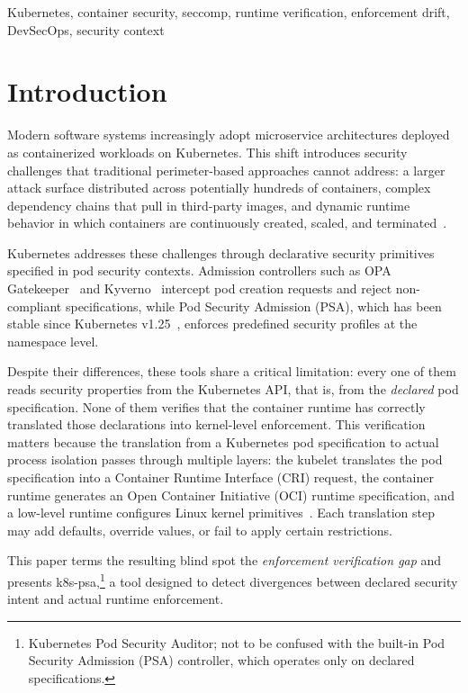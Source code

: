 \documentclass[conference]{IEEEtran}
\begin{document}
\begin{IEEEkeywords}
Kubernetes, container security, seccomp, runtime verification, enforcement drift, DevSecOps, security context
\end{IEEEkeywords}

\section{Introduction}

Modern software systems increasingly adopt microservice architectures deployed as containerized workloads on Kubernetes. This shift introduces security challenges that traditional perimeter-based approaches cannot address: a larger attack surface distributed across potentially hundreds of containers, complex dependency chains that pull in third-party images, and dynamic runtime behavior in which containers are continuously created, scaled, and terminated~\cite{wong2023, devipriya2023}.

Kubernetes addresses these challenges through declarative security primitives specified in pod security contexts. Admission controllers such as OPA Gatekeeper~\cite{gatekeeper2024} and Kyverno~\cite{kyverno2024} intercept pod creation requests and reject non-compliant specifications, while Pod Security Admission (PSA), which has been stable since Kubernetes v1.25~\cite{k8spsa2022}, enforces predefined security profiles at the namespace level.

Despite their differences, these tools share a critical limitation: every one of them reads security properties from the Kubernetes API, that is, from the \emph{declared} pod specification. None of them verifies that the container runtime has correctly translated those declarations into kernel-level enforcement. This verification matters because the translation from a Kubernetes pod specification to actual process isolation passes through multiple layers: the kubelet translates the pod specification into a Container Runtime Interface (CRI) request, the container runtime generates an Open Container Initiative (OCI) runtime specification, and a low-level runtime configures Linux kernel primitives~\cite{k8sseccomp2024}. Each translation step may add defaults, override values, or fail to apply certain restrictions.

This paper terms the resulting blind spot the \emph{enforcement verification gap} and presents k8s-psa,\footnote{Kubernetes Pod Security Auditor; not to be confused with the built-in Pod Security Admission (PSA) controller, which operates only on declared specifications.} a tool designed to detect divergences between declared security intent and actual runtime enforcement.
\end{document}
